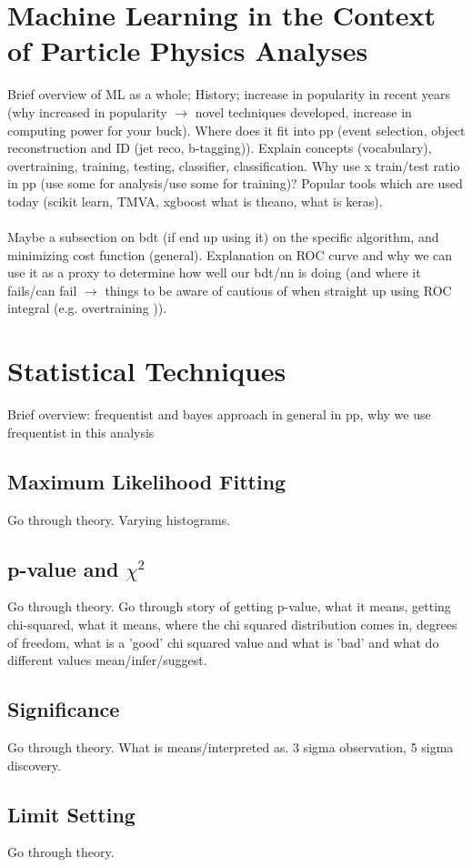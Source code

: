 \section{Machine Learning in the Context of Particle Physics Analyses}
Brief overview of ML as a whole; History; increase in popularity in recent years (why increased in popularity $\rightarrow$ novel techniques developed, increase in computing power for your buck). Where does it fit into pp (event selection, object reconstruction and ID (jet reco, b-tagging)). Explain concepts (vocabulary), overtraining, training, testing, classifier, classification. Why use x train/test ratio in pp (use some for analysis/use some for training)? Popular tools which are used today (scikit learn, TMVA, xgboost what is theano, what is keras).\\\\
Maybe a subsection on bdt (if end up using it) on the specific algorithm, and minimizing cost function (general). Explanation on ROC curve and why we can use it as a proxy to determine how well our bdt/nn is doing (and where it fails/can fail $\rightarrow$ things to be aware of cautious of when straight up using ROC integral (e.g. overtraining )).
\section{Statistical Techniques}
Brief overview: frequentist and bayes approach in general in pp, why we use frequentist in this analysis

\subsection{Maximum Likelihood Fitting}
Go through theory. Varying histograms.
\subsection{p-value and $\chi^2$}
Go through theory. Go through story of getting p-value, what it means, getting chi-squared, what it means, where the chi squared distribution comes in, degrees of freedom, what is a 'good' chi squared value and what is 'bad' and what do different values mean/infer/suggest.
\subsection{Significance}
Go through theory. What is means/interpreted as. 3 sigma observation, 5 sigma discovery. 
\subsection{Limit Setting} 
Go through theory. 







